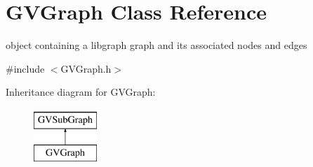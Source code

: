 \hypertarget{class_g_v_graph}{\section{\-G\-V\-Graph \-Class \-Reference}
\label{class_g_v_graph}
}


object containing a libgraph graph and its associated nodes and edges  




{\ttfamily \#include $<$\-G\-V\-Graph.\-h$>$}

\-Inheritance diagram for \-G\-V\-Graph\-:\begin{figure}[H]
\begin{center}
\leavevmode
\includegraphics[height=2.000000cm]{class_g_v_graph}
\end{center}
\end{figure}
